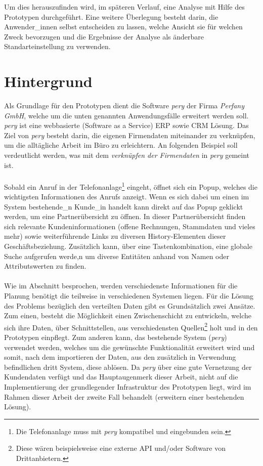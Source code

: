 \documentclass[Bachelorarbeit.tex]{subfiles}
\begin{document}
\newpage
Um dies herauszufinden wird, im späteren Verlauf, eine Analyse mit Hilfe des Prototypen durchgeführt.
Eine weitere Überlegung besteht darin, die Anwender\_innen selbst entscheiden zu lassen, welche Ansicht sie für welchen Zweck bevorzugen und die Ergebnisse der Analyse als änderbare Standarteinstellung zu verwenden.


\section{Hintergrund}
\label{chap:einfuehrung:sec:hintergrund}
Als Grundlage für den Prototypen dient die Software \textit{pery} der Firma \textit{Perfany GmbH}, welche um die unten genannten Anwendungsfälle erweitert werden soll. 
\textit{pery} ist eine webbasierte (Software as a Service) \ac{ERP} sowie \ac{CRM} Lösung.
Das Ziel von \textit{pery} besteht darin, die eigenen Firmendaten miteinander zu verknüpfen, um die alltägliche Arbeit im Büro zu erleichtern.
An folgenden Beispiel soll verdeutlicht werden, was mit dem \textit{verknüpfen der Firmendaten} in \textit{pery} gemeint ist.\\
\\
Sobald ein Anruf in der Telefonanlage\footnote{Die Telefonanlage muss mit \textit{pery} kompatibel und eingebunden sein.} eingeht, öffnet sich ein Popup, welches die wichtigsten Informationen des Anrufs anzeigt. 
Wenn es sich dabei um einen im System bestehende\_n Kunde\_in handelt kann direkt auf das Popup geklickt werden, um eine Partnerübersicht zu öffnen.
In dieser Partnerübersicht finden sich relevante Kundeninformationen (offene Rechnungen, Stammdaten und vieles mehr) sowie weiterführende Links zu diversen History-Elementen dieser Geschäftsbeziehung.
Zusätzlich kann, über eine Tastenkombination, eine globale Suche aufgerufen werde,n um diverse Entitäten anhand von Namen oder Attributswerten zu finden. \\
\\
Wie im Abschnitt  besprochen, werden verschiedenste Informationen für die Planung benötigt die teilweise in verschiedenen Systemen liegen. 
Für die Lösung des Problems bezüglich den verteilten Daten gibt es Grundsätzlich zwei Ansätze.
Zum einen, besteht die Möglichkeit einen Zwischenschicht zu entwickeln, welche sich ihre Daten, über Schnittstellen, aus verschiedensten Quellen\footnote{Diese wären beispielsweise eine externe \ac{API} und/oder Software von Drittanbietern.} holt und in den Prototypen einpflegt.
Zum anderen kann, das bestehende System (\textit{pery}) verwendet werden, welches um die gewünschte Funktionalität erweitert wird und somit, nach dem importieren der Daten, aus den zusätzlich in Verwendung befindlichen dritt System, diese ablösen. 
Da \textit{pery} über eine gute Vernetzung der Kundendaten verfügt und das Hauptaugenmerk dieser Arbeit, nicht auf die Implementierung der grundlegender Infrastruktur des Prototypen liegt, wird im Rahmen dieser Arbeit der zweite Fall behandelt (erweitern einer bestehenden Lösung).
\end{document}
